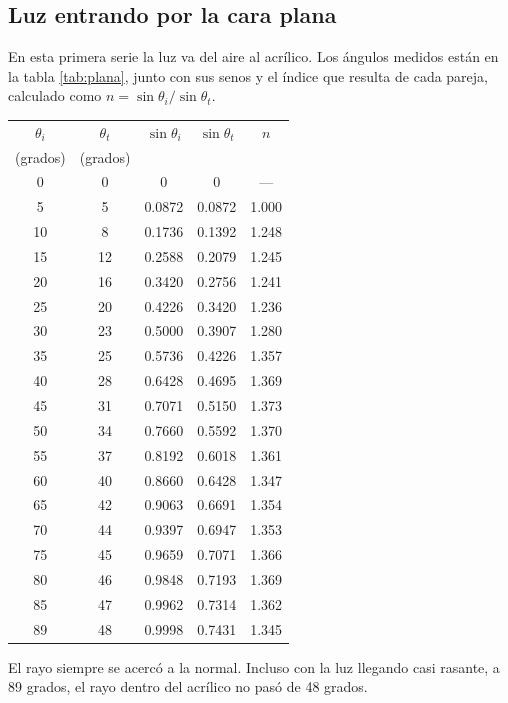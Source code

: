 \subsection{Luz entrando por la cara plana}
En esta primera serie la luz va del aire al acrílico. Los ángulos medidos están en la tabla \ref{tab:plana}, junto con sus senos y el índice que resulta de cada pareja, calculado como $n = \sin\theta_i / \sin\theta_t$.

\begin{center}
\begin{tabular}{ccccc}
\hline
$\theta_i$ & $\theta_t$ & $\sin\theta_i$ & $\sin\theta_t$ & $n$ \\
(grados) & (grados) & & & \\
\hline
0  & 0  & 0      & 0      & ---   \\
5  & 5  & 0.0872 & 0.0872 & 1.000 \\
10 & 8  & 0.1736 & 0.1392 & 1.248 \\
15 & 12 & 0.2588 & 0.2079 & 1.245 \\
20 & 16 & 0.3420 & 0.2756 & 1.241 \\
25 & 20 & 0.4226 & 0.3420 & 1.236 \\
30 & 23 & 0.5000 & 0.3907 & 1.280 \\
35 & 25 & 0.5736 & 0.4226 & 1.357 \\
40 & 28 & 0.6428 & 0.4695 & 1.369 \\
45 & 31 & 0.7071 & 0.5150 & 1.373 \\
50 & 34 & 0.7660 & 0.5592 & 1.370 \\
55 & 37 & 0.8192 & 0.6018 & 1.361 \\
60 & 40 & 0.8660 & 0.6428 & 1.347 \\
65 & 42 & 0.9063 & 0.6691 & 1.354 \\
70 & 44 & 0.9397 & 0.6947 & 1.353 \\
75 & 45 & 0.9659 & 0.7071 & 1.366 \\
80 & 46 & 0.9848 & 0.7193 & 1.369 \\
85 & 47 & 0.9962 & 0.7314 & 1.362 \\
89 & 48 & 0.9998 & 0.7431 & 1.345 \\
\hline
\end{tabular}
\label{tab:plana}
\end{center}

El rayo siempre se acercó a la normal. Incluso con la luz llegando casi rasante, a 89 grados, el rayo dentro del acrílico no pasó de 48 grados.

